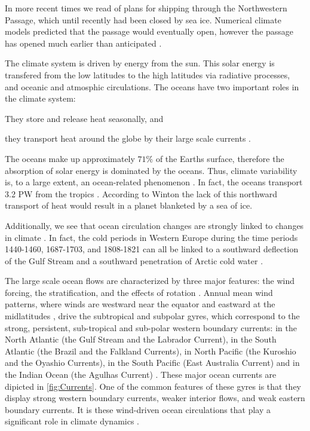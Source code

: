 In more recent times we read of plans for shipping through the Northwestern
Passage, which until recently had been closed by sea ice. Numerical climate
models predicted that the passage would eventually open, however the passage has
opened much earlier than anticipated \cite{NatGeo}.

The climate system is driven by energy from the sun. This solar energy is
transfered from the low latitudes to the high latitudes via radiative processes,
and oceanic and atmosphic circulations. The oceans have two important roles in
the climate system: \begin{inparaenum}[1)]\item They store and release heat
seasonally, and \item they transport heat around the globe by their large scale
currents \cite{Winton2003}.\end{inparaenum} The oceans make up approximately
$71\%$ of the Earths surface, therefore the absorption of solar energy is
dominated by the oceans.  Thus, climate variability is, to a large extent, an
ocean-related phenomenon \cite{Siedler01}. In fact, the oceans transport 3.2
PW from the tropics \cite{Trenberth2001}. According to Winton
\cite{Winton2003} the lack of this northward transport of heat would result in
a planet blanketed by a sea of ice.

Additionally, we see that ocean circulation changes are strongly linked to
changes in climate \cite{Morner95, Siedler01}. In fact, the cold periods in
Western Europe during the time periods 1440-1460, 1687-1703, and 1808-1821 can
all be linked to a southward deflection of the Gulf Stream and a southward
penetration of Arctic cold water \cite{Morner95}.

The large scale ocean flows are characterized by three major features: the wind
forcing, the stratification, and the effects of rotation \cite{Majda, Vallis06}.
Annual mean wind patterns, where winds are westward near the equator and
eastward at the midlatitudes \cite{Dijkstra08}, drive the subtropical and
subpolar gyres, which correspond to the strong, persistent, sub-tropical and
sub-polar western boundary currents: in the North Atlantic (the Gulf Stream and
the Labrador Current), in the South Atlantic (the Brazil and the Falkland
Currents), in North Pacific (the Kuroshio and the Oyashio Currents), in the
South Pacific (East Australia Current) and in the Indian Ocean (the Agulhas
Current) \cite{Dijkstra08,Vallis06}. These major ocean currents are dipicted in
\autoref{fig:Currents}. One of the common features of these gyres is that they
display strong western boundary currents, weaker interior flows, and weak
eastern boundary currents. It is these wind-driven ocean circulations that play a
significant role in climate dynamics \cite{Beesley2008,Dijkstra05,Ekman1905,Ghil08}.


